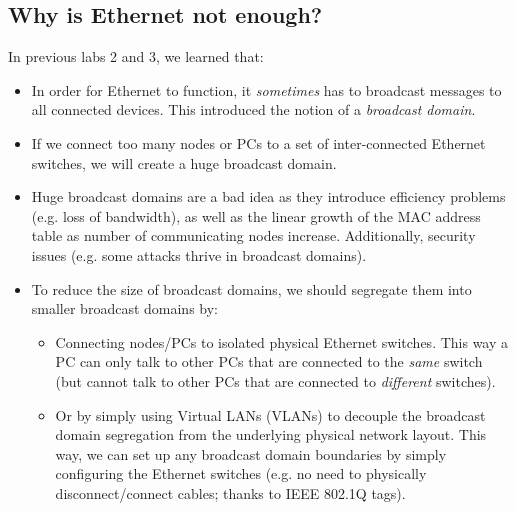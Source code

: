 \documentclass[pdftex,12pt,a4paper]{article}
\begin{document}
        \subsection{Why is Ethernet not enough?}
            In previous labs 2 and 3, we learned that:
            \begin{itemize}
                \item In order for Ethernet to function, it \emph{sometimes}
                    has to broadcast messages to all connected devices. This
                    introduced the notion of a \emph{broadcast domain}.
                \item If we connect too many nodes or PCs to a set of
                    inter-connected Ethernet switches, we will create a huge
                    broadcast domain.
                \item Huge broadcast domains are a bad idea as they introduce
                    efficiency problems (e.g. loss of bandwidth), as well as
                    the linear growth of the MAC address table as number of
                    communicating nodes increase. Additionally, security issues
                    (e.g. some attacks thrive in broadcast domains).
                \item To reduce the size of broadcast domains, we should
                    segregate them into smaller broadcast domains by:
                    \begin{itemize}
                        \item Connecting nodes/PCs to isolated physical
                            Ethernet switches. This way a PC can only talk to
                            other PCs that are connected to the \emph{same}
                            switch (but cannot talk to other PCs that are
                            connected to \emph{different} switches).
                        \item Or by simply using Virtual LANs (VLANs) to
                            decouple the broadcast domain segregation from the
                            underlying physical network layout. This way, we
                            can set up any broadcast domain boundaries by
                            simply configuring the Ethernet switches (e.g. no
                            need to physically disconnect/connect cables;
                            thanks to IEEE 802.1Q tags).
                    \end{itemize}
                \end{itemize}
\end{document}
